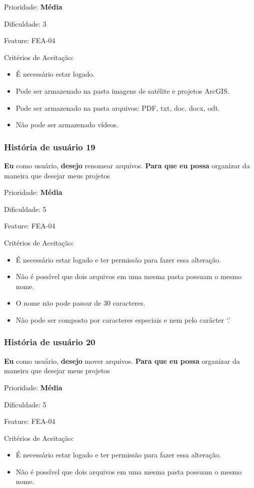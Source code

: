     Prioridade: \textbf{Média}

    Dificuldade: 3

    Feature: FEA-04

    Critérios de Aceitação:
    \begin{itemize}
      \item É necessário estar logado.
      \item Pode ser armazenado na pasta imagens de satélite e projetos ArcGIS.
      \item Pode ser  armazenado na pasta arquivos: PDF, txt, doc, docx, odt.
      \item Não pode ser armazenado vídeos. 
    \end{itemize}

  \subsubsection{História de usuário 19}
    \textbf{Eu} como usuário, \textbf{desejo} renomear arquivos. \textbf{Para que eu possa} organizar da maneira que desejar meus projetos

    Prioridade: \textbf{Média}

    Dificuldade: 5

    Feature: FEA-04

    Critérios de Aceitação:
    \begin{itemize}
      \item É necessário estar logado e ter permissão para fazer essa alteração.
      \item Não é possível que dois arquivos em uma mesma pasta possuam o mesmo nome.
      \item O nome não pode passar de 30 caracteres. 
      \item Não pode ser composto por caracteres especiais e nem pelo carácter  ‘.’
    \end{itemize}

  \subsubsection{História de usuário 20}
    \textbf{Eu} como usuário, \textbf{desejo} mover arquivos. \textbf{Para que eu possa} organizar da maneira que desejar meus projetos

    Prioridade: \textbf{Média}

    Dificuldade: 5

    Feature: FEA-04

    Critérios de Aceitação:
    \begin{itemize}
      \item É necessário estar logado e ter permissão para fazer essa alteração.
      \item Não é possível que dois arquivos em uma mesma pasta possuam o mesmo nome.
    \end{itemize}

